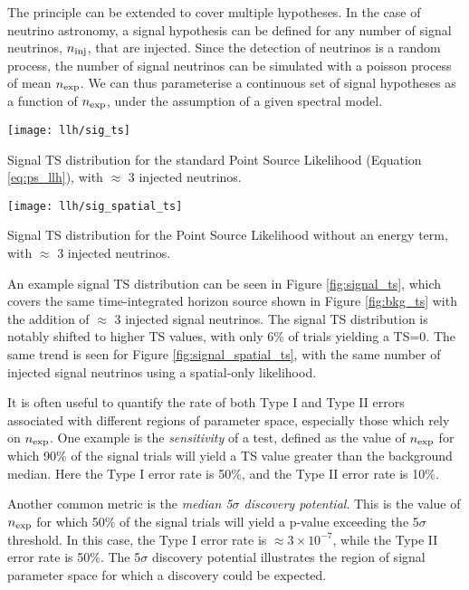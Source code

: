 The principle can be extended to cover multiple hypotheses. In the case of neutrino astronomy, a signal hypothesis can be defined for any number of signal neutrinos, $n_{\textup{inj}}$, that are injected. Since the detection of neutrinos is a random process, the number of signal neutrinos can be simulated with a poisson process of mean $n_{\textup{exp}}$. We can thus parameterise a continuous set of signal hypotheses as a function of $n_{\textup{exp}}$, under the assumption of a given spectral model. 

\begin{marginfigure}
	\centering \texttt{[image: llh/sig\_ts]}
	\caption{Signal TS distribution for the standard Point Source Likelihood (Equation \ref{eq:ps_llh}), with $\approx$ 3 injected neutrinos.}
	\label{fig:signal_ts}
\end{marginfigure}

\begin{marginfigure}
	\centering \texttt{[image: llh/sig\_spatial\_ts]}
	\caption{Signal TS distribution for the Point Source Likelihood without an energy term, with $\approx$ 3 injected neutrinos.}
	\label{fig:signal_spatial_ts}
\end{marginfigure}

An example signal TS distribution can be seen in Figure \ref{fig:signal_ts}, which covers the same time-integrated horizon source shown in Figure \ref{fig:bkg_ts} with the addition of $\approx$ 3 injected signal neutrinos. The signal TS distribution is notably shifted to higher TS values, with only 6\% of trials yielding a TS=0. The same trend is seen for Figure \ref{fig:signal_spatial_ts}, with the same number of injected signal neutrinos using a spatial-only likelihood.

It is often useful to quantify the rate of both Type  I and Type II errors associated with different regions of parameter space, especially those which rely on $n_{\textup{exp}}$. One example is the \emph{sensitivity} of a test, defined as the value of $n_{\textup{exp}}$ for which 90\% of the signal trials will yield a TS value greater than the background median. Here the Type I error rate is 50\%, and the Type II error rate is 10\%. 

Another common metric is the \emph{median 5$\sigma$ discovery potential}. This is the value of $n_{\textup{exp}}$ for which 50\% of the signal trials will yield a p-value exceeding the 5$\sigma$ threshold. In this case, the Type I error rate is $\approx 3 \times 10^{-7}$, while the Type II error rate is 50\%. The 5$\sigma$ discovery potential illustrates the region of signal parameter space for which a discovery could be expected. 


